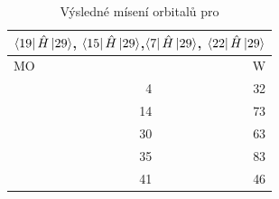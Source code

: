 \documentclass[
  printed, %
  table,   %
  lof,     %
  lot,     %
  oneside,
]{fithesis3}
\begin{document}
\begin{table}[htbp]
\caption{Výsledné mísení orbitalů pro }
\begin{center}
\begin{tabular}{|r|r|}
\hline
\multicolumn{2}{|c|}{$\bra{19}{\hat{H}}\ket{29}$, $\bra{15}{\hat{H}}\ket{29}$,$\bra{7}{\hat{H}}\ket{29}$, $\bra{22}{\hat{H}}\ket{29}$} \\
\hline \hline
\multicolumn{1}{|l|}{MO} & \multicolumn{1}{r|}{W} \\ \hline
4 & 32 \\ \hline
14 & 73 \\ \hline
30 & 63 \\ \hline
35 & 83 \\ \hline
41 & 46 \\ \hline
\end{tabular}

\label{tab_sio3_vysledky}\end{center}
\end{table}
\end{document}

